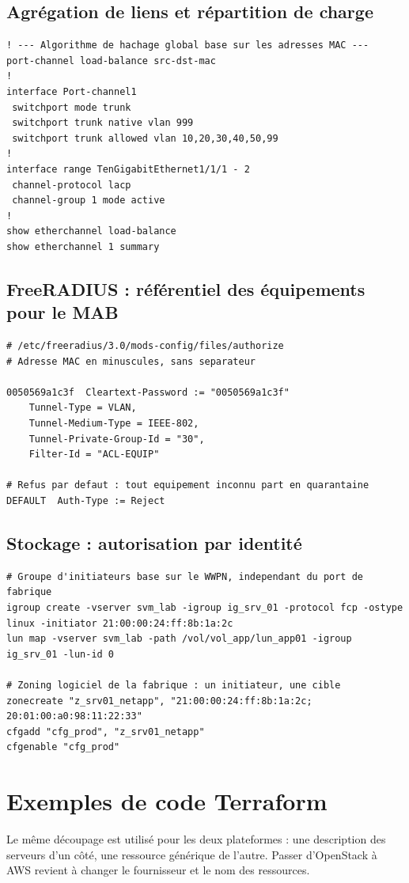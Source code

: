 \documentclass[11pt,a4paper]{article}
\begin{document}
\subsection{Agrégation de liens et répartition de charge}
\begin{lstlisting}
! --- Algorithme de hachage global base sur les adresses MAC ---
port-channel load-balance src-dst-mac
!
interface Port-channel1
 switchport mode trunk
 switchport trunk native vlan 999
 switchport trunk allowed vlan 10,20,30,40,50,99
!
interface range TenGigabitEthernet1/1/1 - 2
 channel-protocol lacp
 channel-group 1 mode active
!
show etherchannel load-balance
show etherchannel 1 summary
\end{lstlisting}

\subsection{FreeRADIUS : référentiel des équipements pour le MAB}
\begin{lstlisting}
# /etc/freeradius/3.0/mods-config/files/authorize
# Adresse MAC en minuscules, sans separateur

0050569a1c3f  Cleartext-Password := "0050569a1c3f"
    Tunnel-Type = VLAN,
    Tunnel-Medium-Type = IEEE-802,
    Tunnel-Private-Group-Id = "30",
    Filter-Id = "ACL-EQUIP"

# Refus par defaut : tout equipement inconnu part en quarantaine
DEFAULT  Auth-Type := Reject
\end{lstlisting}

\subsection{Stockage : autorisation par identité}
\begin{lstlisting}
# Groupe d'initiateurs base sur le WWPN, independant du port de fabrique
igroup create -vserver svm_lab -igroup ig_srv_01 -protocol fcp -ostype linux -initiator 21:00:00:24:ff:8b:1a:2c
lun map -vserver svm_lab -path /vol/vol_app/lun_app01 -igroup ig_srv_01 -lun-id 0

# Zoning logiciel de la fabrique : un initiateur, une cible
zonecreate "z_srv01_netapp", "21:00:00:24:ff:8b:1a:2c; 20:01:00:a0:98:11:22:33"
cfgadd "cfg_prod", "z_srv01_netapp"
cfgenable "cfg_prod"
\end{lstlisting}

\section{Exemples de code Terraform}\label{ann:terraform}
Le même découpage est utilisé pour les deux plateformes : une description des serveurs d'un côté, une ressource générique de l'autre. Passer d'OpenStack à AWS revient à changer le fournisseur et le nom des ressources.
\end{document}
